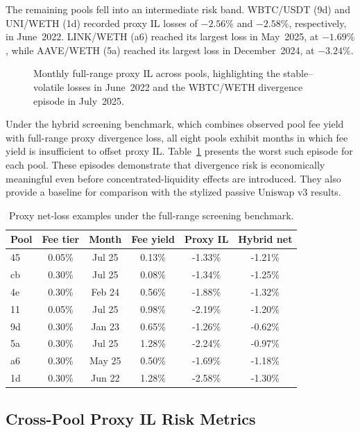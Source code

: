 \documentclass[10pt,conference,compsocconf]{IEEEtran}
\begin{document}
The remaining pools fell into an intermediate risk band. WBTC/USDT (9d) and UNI/WETH (1d) recorded proxy IL losses of $-2.56\%$ and $-2.58\%$, respectively, in June~2022. LINK/WETH (a6) reached its largest loss in May~2025, at $-1.69\%$, while AAVE/WETH (5a) reached its largest loss in December~2024, at $-3.24\%$.

\begin{figure}[t]
  \centering
  
  \caption{Monthly full-range proxy IL across pools, highlighting the
  stable--volatile losses in June~2022 and the WBTC/WETH divergence
  episode in July~2025.}
  \label{fig:monthly_il}
\end{figure}

Under the hybrid screening benchmark, which combines observed pool fee yield with full-range proxy divergence loss, all eight pools exhibit months in which fee yield is insufficient to offset proxy IL. Table~\ref{tab:worst_net_loss} presents the worst such episode for each pool. These episodes demonstrate that divergence risk is economically meaningful even before concentrated-liquidity effects are introduced. They also provide a baseline for comparison with the stylized passive Uniswap v3 results.

\begin{table}[b]
\centering
\footnotesize
\begin{tabular}{lccccc}
\toprule
Pool & Fee tier & Month & Fee yield & Proxy IL & Hybrid net \\
\midrule
45 & 0.05\% & Jul 25 & 0.13\% & -1.33\% & -1.21\% \\
cb & 0.30\% & Jul 25 & 0.08\% & -1.34\% & -1.25\% \\
4e & 0.30\% & Feb 24 & 0.56\% & -1.88\% & -1.32\% \\
11 & 0.05\% & Jul 25 & 0.98\% & -2.19\% & -1.20\% \\
9d & 0.30\% & Jan 23 & 0.65\% & -1.26\% & -0.62\% \\
5a & 0.30\% & Jul 25 & 1.28\% & -2.24\% & -0.97\% \\
a6 & 0.30\% & May 25 & 0.50\% & -1.69\% & -1.18\% \\
1d & 0.30\% & Jun 22 & 1.28\% & -2.58\% & -1.30\% \\
\bottomrule
\end{tabular}
\caption{Proxy net-loss examples under the full-range screening benchmark.}
\label{tab:worst_net_loss}
\end{table}

\subsection{Cross-Pool Proxy IL Risk Metrics}
\end{document}
